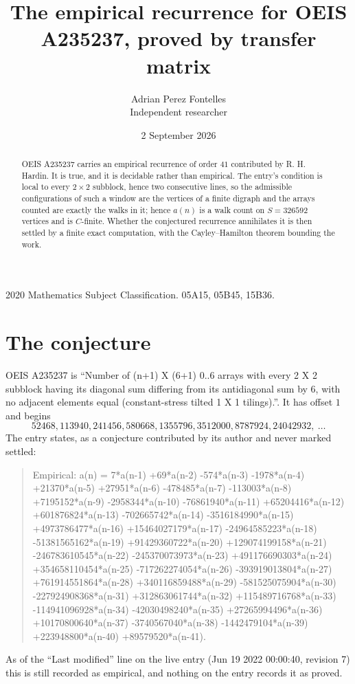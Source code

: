 \documentclass[11pt,a4paper]{article}
\title{The empirical recurrence for OEIS A235237, proved by transfer matrix}
\author{Adrian Perez Fontelles\\ \small Independent researcher}
\date{2 September 2026}
\theoremstyle{plain}
\theoremstyle{definition}
\begin{document}
\maketitle

\begin{abstract}
OEIS A235237 carries an empirical recurrence of order $41$ contributed by R. H. Hardin. It is
true, and it is decidable rather than empirical. The entry's condition is local to every $2\times2$ subblock, hence two consecutive lines, so
the admissible configurations of such a window are the vertices of a finite digraph and the
arrays counted are exactly the walks in it; hence $a(n)$ is a walk count on $S=326592$ vertices
and is $C$-finite. Whether the conjectured recurrence annihilates it is then settled by a
finite exact computation, with the Cayley--Hamilton theorem bounding the work.
\end{abstract}

\noindent\small 2020 Mathematics Subject Classification. 05A15, 05B45, 15B36.\normalsize

\section{The conjecture}

OEIS A235237 is ``Number of (n+1) X (6+1) 0..6 arrays with every 2 X 2 subblock having its diagonal sum differing from its antidiagonal sum by 6, with no adjacent elements equal (constant-stress tilted 1 X 1 tilings).''. It has offset $1$ and begins
\[
52468, 113940, 241456, 580668, 1355796, 3512000, 8787924, 24042932,\ \dots
\]
The entry states, as a conjecture contributed by its author and never marked settled:
\begin{quote}
Empirical: a(n) = 7*a(n-1) +69*a(n-2) -574*a(n-3) -1978*a(n-4) +21370*a(n-5) +27951*a(n-6) -478485*a(n-7) -113003*a(n-8) +7195152*a(n-9) -2958344*a(n-10) -76861940*a(n-11) +65204416*a(n-12) +601876824*a(n-13) -702665742*a(n-14) -3516184990*a(n-15) +4973786477*a(n-16) +15464027179*a(n-17) -24964585223*a(n-18) -51381565162*a(n-19) +91429360722*a(n-20) +129074199158*a(n-21) -246783610545*a(n-22) -245370073973*a(n-23) +491176690303*a(n-24) +354658110454*a(n-25) -717262274054*a(n-26) -393919013804*a(n-27) +761914551864*a(n-28) +340116859488*a(n-29) -581525075904*a(n-30) -227924908368*a(n-31) +312863061744*a(n-32) +115489716768*a(n-33) -114941096928*a(n-34) -42030498240*a(n-35) +27265994496*a(n-36) +10170800640*a(n-37) -3740567040*a(n-38) -1442479104*a(n-39) +223948800*a(n-40) +89579520*a(n-41).
\end{quote}
As of the ``Last modified'' line on the live entry (Jun 19 2022 00:00:40, revision 7) this is still
recorded as empirical, and nothing on the entry records it as proved.
\end{document}
